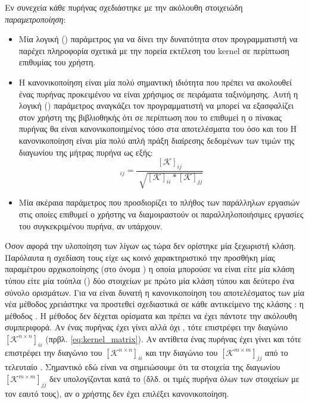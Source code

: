 Εν συνεχεία κάθε πυρήνας σχεδιάστηκε με την ακόλουθη στοιχειώδη \textit{παραμετροποίηση}:
\begin{itemize}
\item {} Μία λογική () παράμετρος για να δίνει την δυνατότητα στον προγραμματιστή να παρέχει πληροφορία σχετικά με την πορεία εκτέλεση του kernel σε περίπτωση επιθυμίας του χρήστη.
\item {} Η κανονικοποίηση είναι μία πολύ σημαντική ιδιότητα που πρέπει να ακολουθεί ένας πυρήνας προκειμένου να είναι χρήσιμος σε πειράματα ταξινόμησης. Αυτή η λογική () παράμετρος αναγκάζει τον προγραμματιστή να μπορεί να εξασφαλίζει στον χρήστη της βιβλιοθηκής ότι σε περίπτωση που το επιθυμεί η ο πίνακας πυρήνας θα είναι κανονικοποιημένος τόσο στα αποτελέσματα του  όσο και του  Η κανονικοποίηση είναι μία πολύ απλή πράξη διαίρεσης δεδομένων των τιμών της διαγωνίου της μήτρας πυρήνα ως εξής:
    \begin{equation}
        [\mathcal{\hat{K}}]_{ij} = \frac{[\mathcal{K}]_{ij}}{\sqrt[]{[\mathcal{K}]_{ii}*[\mathcal{K}]_{jj}}}
    \end{equation}
\item {} Μία ακέραια  παράμετρος που προσδιορίζει το πλήθος των παράλληλων εργασιών στις οποίες επιθυμεί ο χρήστης να διαμοιραστούν οι παραλληλοποιήσιμες εργασίες του συγκεκριμένου πυρήνα, αν υπάρχουν.
\end{itemize}

Όσον αφορά την υλοποίηση των λίγων ως τώρα  δεν ορίστηκε μία ξεχωριστή κλάση.
Παρόλαυτα η σχεδίαση τους είχε ως κοινό χαρακτηριστικό την προσθήκη μίας παραμέτρου αρχικοποίησης (στο όνομα ) η οποία μπορούσε να είναι είτε μία κλάση τύπου  είτε μία τούπλα () δύο στοιχείων με πρώτο μία κλάση τύπου  και δεύτερο ένα σύνολο ορισμάτων.
Για να είναι δυνατή η κανονικοποίηση του αποτελέσματος των  μία νέα μέθοδος χρειάστηκε να προστεθεί σχεδιαστικά σε κάθε αντικείμενο της κλάσης : η μέθοδος .
Η μέθοδος δεν δέχεται ορίσματα και πρέπει να έχει πάντοτε την ακόλουθη συμπεριφορά. Αν ένας πυρήνας έχει γίνει  αλλά όχι , τότε επιστρέφει την διαγώνιο $[\mathcal{K}^{n\times n}]_{ii}$ (πρβλ. \ref{eq:kernel_matrix}).
Αν αντίθετα ένας πυρήνας έχει γίνει  και  τότε επιστρέφει την διαγώνιο του $[\mathcal{K}^{n\times n}]_{ii}$ και την διαγώνιο του $[\mathcal{K}^{m\times m}]_{jj}$ από το τελευταίο .
Σημαντικό εδώ είναι να σημειώσουμε ότι τα στοιχεία της διαγωνίου $[\mathcal{K}^{m\times m}]_{jj}$ δεν υπολογίζονται κατά το  (δλδ. οι τιμές πυρήνα όλων των στοιχείων με τον εαυτό τους), αν ο χρήστης δεν έχει επιλέξει κανονικοποίηση.

